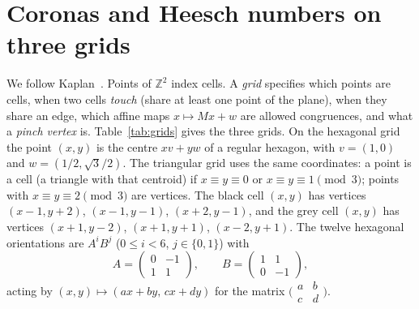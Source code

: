 \documentclass[10pt,a4paper]{article}
\theoremstyle{definition}
\theoremstyle{remark}
\newcommand{\Z}{\mathbb Z}
\begin{document}
\section{Coronas and Heesch numbers on three grids}
\label{sec:defs}
We follow Kaplan~\cite[Sections~2.1 and~4]{Kaplan}. Points of $\Z^2$
index cells. A \emph{grid} specifies which points are cells, when two
cells \emph{touch} (share at least one point of the plane), when they
share an edge, which affine maps $x\mapsto Mx+w$ are allowed congruences,
and what a \emph{pinch vertex} is. Table~\ref{tab:grids} gives the three
grids. On the hexagonal grid the point $(x,y)$ is the centre $xv+yw$ of a
regular hexagon, with $v=(1,0)$ and $w=(1/2,\sqrt3/2)$. The triangular
grid uses the same coordinates: a point is a cell (a triangle with that
centroid) if $x\equiv y\equiv0$ or $x\equiv y\equiv1\pmod 3$; points
with $x\equiv y\equiv2\pmod3$ are vertices. The black cell $(x,y)$ has
vertices $(x-1,y+2)$, $(x-1,y-1)$, $(x+2,y-1)$, and the grey cell
$(x,y)$ has vertices $(x+1,y-2)$, $(x+1,y+1)$, $(x-2,y+1)$. The twelve
hexagonal orientations are $A^iB^j$ ($0\leq i<6$, $j\in\{0,1\}$) with
\[
A=\begin{pmatrix}0&-1\\1&1\end{pmatrix},\qquad
B=\begin{pmatrix}1&1\\0&-1\end{pmatrix},
\]
acting by $(x,y)\mapsto(ax+by,\,cx+dy)$ for the matrix
$\bigl(\begin{smallmatrix}a&b\\c&d\end{smallmatrix}\bigr)$.
\end{document}
